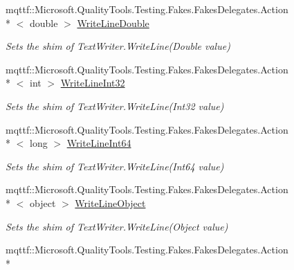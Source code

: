 \begin{DoxyCompactItemize}
mqttf\-::\-Microsoft.\-Quality\-Tools.\-Testing.\-Fakes.\-Fakes\-Delegates.\-Action\\*
$<$ double $>$ \hyperlink{class_system_1_1_i_o_1_1_fakes_1_1_shim_text_writer_a384eef693161d4b12dc3ac78e259a483}{Write\-Line\-Double}
\begin{DoxyCompactList}\small\item\em Sets the shim of Text\-Writer.\-Write\-Line(\-Double value)\end{DoxyCompactList}\item 
mqttf\-::\-Microsoft.\-Quality\-Tools.\-Testing.\-Fakes.\-Fakes\-Delegates.\-Action\\*
$<$ int $>$ \hyperlink{class_system_1_1_i_o_1_1_fakes_1_1_shim_text_writer_a51907b94ab5c683cbe0dda4327e7f590}{Write\-Line\-Int32}
\begin{DoxyCompactList}\small\item\em Sets the shim of Text\-Writer.\-Write\-Line(\-Int32 value)\end{DoxyCompactList}\item 
mqttf\-::\-Microsoft.\-Quality\-Tools.\-Testing.\-Fakes.\-Fakes\-Delegates.\-Action\\*
$<$ long $>$ \hyperlink{class_system_1_1_i_o_1_1_fakes_1_1_shim_text_writer_aba9da58569496537b0596c8364b7be79}{Write\-Line\-Int64}
\begin{DoxyCompactList}\small\item\em Sets the shim of Text\-Writer.\-Write\-Line(\-Int64 value)\end{DoxyCompactList}\item 
mqttf\-::\-Microsoft.\-Quality\-Tools.\-Testing.\-Fakes.\-Fakes\-Delegates.\-Action\\*
$<$ object $>$ \hyperlink{class_system_1_1_i_o_1_1_fakes_1_1_shim_text_writer_acf4fa1bc525382fef697e0588db86000}{Write\-Line\-Object}
\begin{DoxyCompactList}\small\item\em Sets the shim of Text\-Writer.\-Write\-Line(\-Object value)\end{DoxyCompactList}\item 
mqttf\-::\-Microsoft.\-Quality\-Tools.\-Testing.\-Fakes.\-Fakes\-Delegates.\-Action\\*

\end{DoxyCompactItemize}
